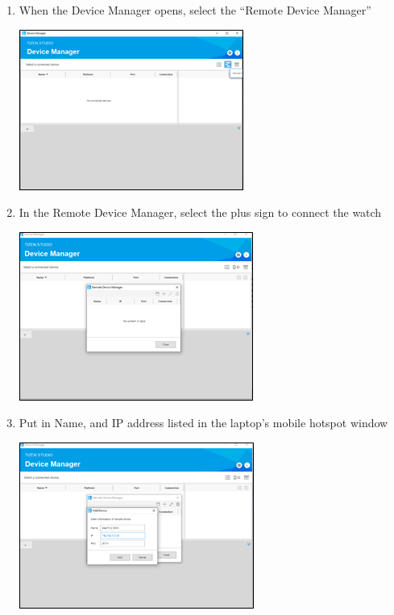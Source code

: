 \documentclass[12pt, a4paper]{article}
\begin{document}
\begin{enumerate}
\begin{center}
\end{center}
  \item When the Device Manager opens, select the “Remote Device Manager”
      \begin{center}
    \includegraphics[width=.6\textwidth]{Pic 16.2.png}
\end{center}
  \item In the Remote Device Manager, select the plus sign to connect the watch
      \begin{center}
    \includegraphics[width=.6\textwidth]{Pic 17.2.png}
\end{center}
  \item Put in Name, and IP address listed in the laptop’s mobile hotspot window 
      \begin{center}
    \includegraphics[width=.6\textwidth]{Pic 18.2.png}
\end{center}

\end{enumerate}
\end{document}
